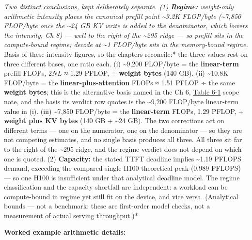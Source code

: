 \emph{Two distinct conclusions, kept deliberately separate. (1)
\textbf{Regime:} weight-only arithmetic intensity places the canonical
prefill point \textasciitilde9.2K FLOP/byte (\textasciitilde7,850
FLOP/byte once the \textasciitilde24 GB KV write is added to the
denominator, which lowers the intensity, Ch 8) --- well to the right of
the \textasciitilde295 ridge --- so prefill sits in the compute-bound
regime; decode at \textasciitilde1 FLOP/byte sits in the memory-bound
regime. }Basis of these intensity figures, so the chapters reconcile:*
the three values rest on three different bases, one ratio each. (i)
\textasciitilde9,200 FLOP/byte = the \textbf{linear-term} prefill FLOPs,
\(2NL\) ≈ 1.29 PFLOP, ÷ \textbf{weight bytes} (140 GB). (ii)
\textasciitilde10.8K FLOP/byte = the \textbf{linear-plus-attention}
FLOPs ≈ 1.51 PFLOP ÷ the same \textbf{weight bytes}; this is the
alternative basis named in the Ch 6, \hyperref[tab:6.1]{Table 6-1} scope note, and the basis
its verdict row quotes is the \textasciitilde9,200 FLOP/byte linear-term
value in (i). (iii) \textasciitilde7,850 FLOP/byte = the
\textbf{linear-term} FLOPs, 1.29 PFLOP, ÷ \textbf{weight plus KV bytes}
(140 GB + \textasciitilde24 GB). The two corrections act on different
terms --- one on the numerator, one on the denominator --- so they are
not competing estimates, and no single basis produces all three. All
three sit far to the right of the \textasciitilde295 ridge, and the
regime verdict does not depend on which one is quoted. (2)
\textbf{Capacity:} the stated TTFT deadline implies \textasciitilde1.19
PFLOPS demand, exceeding the compared single-H100 theoretical peak
(0.989 PFLOPS) --- so one H100 is insufficient under that analytical
deadline model. The regime classification and the capacity shortfall are
independent: a workload can be compute-bound in regime yet still fit on
the device, and vice versa. (Analytical bounds --- not a benchmark:
these are first-order model checks, not a measurement of actual serving
throughput.)*

\textbf{Worked example arithmetic details:}


